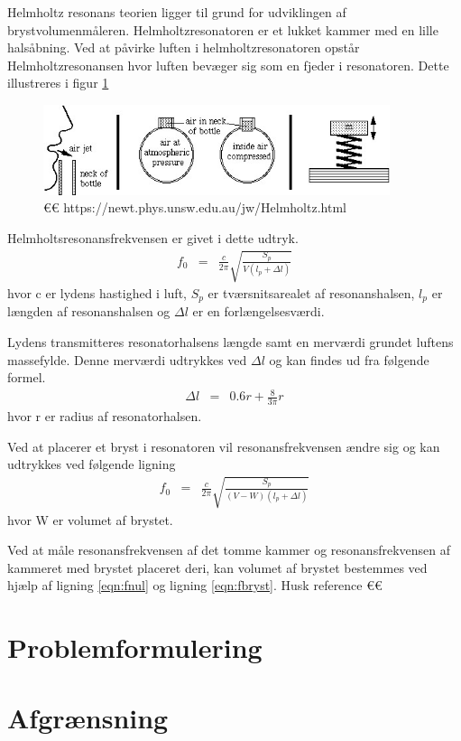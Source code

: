 Helmholtz resonans teorien ligger til grund for udviklingen af brystvolumenmåleren. Helmholtzresonatoren er et lukket kammer med en lille halsåbning. Ved at påvirke luften i helmholtzresonatoren opstår Helmholtzresonansen hvor luften bevæger sig som en fjeder i resonatoren. Dette illustreres i  figur \ref{fig:Helmholtzteori}

\begin{figure}[htb]
\centering
\includegraphics[width=4in]{Helmholtzresonans}
\caption{€€ https://newt.phys.unsw.edu.au/jw/Helmholtz.html}
\label{fig:Helmholtzteori}
\end{figure}


 
Helmholtsresonansfrekvensen er givet i dette udtryk. 
\begin{eqnarray}
\label{eqn:fnul}
f_{0}&=&\frac{c}{2\pi}\sqrt{\frac{S_{p}}{V \left(l_{p}+\Delta l\right)}}
\end{eqnarray}
hvor c er lydens hastighed i luft, $S_{p}$ er tværsnitsarealet af resonanshalsen, $l_{p}$ er længden af resonanshalsen og $\Delta l$ er en forlængelsesværdi. 

Lydens transmitteres resonatorhalsens længde samt en merværdi grundet luftens massefylde. Denne merværdi udtrykkes ved $\Delta l$ og kan findes ud fra følgende formel. 
\begin{eqnarray}
\Delta l&=&0.6r+\frac{8}{3\pi}r
\end{eqnarray}
hvor r er radius af resonatorhalsen.

Ved at placerer et bryst i resonatoren vil resonansfrekvensen ændre sig og kan udtrykkes ved følgende ligning
\begin{eqnarray}
\label{eqn:fbryst}
f_{0}&=&\frac{c}{2\pi}\sqrt{\frac{S_{p}}{(V-W)\left(l_{p}+\Delta l\right)}}
\end{eqnarray}
hvor W er volumet af brystet. 

Ved at måle resonansfrekvensen af det tomme kammer og resonansfrekvensen af kammeret med brystet placeret deri, kan volumet af brystet bestemmes ved hjælp af ligning \ref{eqn:fnul} og ligning \ref{eqn:fbryst}. Husk reference €€









\section{Problemformulering}

\section{Afgrænsning}
